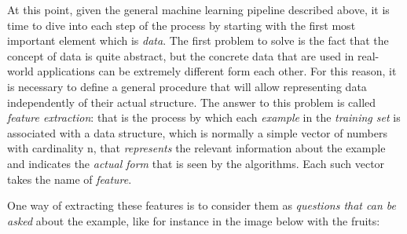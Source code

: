 At this point, given the general machine learning pipeline described
above, it is time to dive into each step of the process by starting
with the first most important element which is \emph{data}. The first
problem to solve is the fact that the concept of data is quite abstract,
but the concrete data that are used in real-world applications can be
extremely different form each other. For this reason, it is necessary to
define a general procedure that will allow representing data
independently of their actual structure. The answer to this problem is
called \emph{feature extraction}: that is the process by which each
\emph{example} in the \emph{training set} is associated with a data
structure, which is normally a simple vector of numbers with cardinality
n, that \emph{represents} the relevant information about the example and
indicates the \emph{actual form} that is seen by the algorithms. Each
such vector takes the name of \emph{feature}.

\newpage

One way of extracting these features is to consider them as
\emph{questions that can be asked} about the example, like for instance
in the image below with the fruits:

\vspace{5mm}

